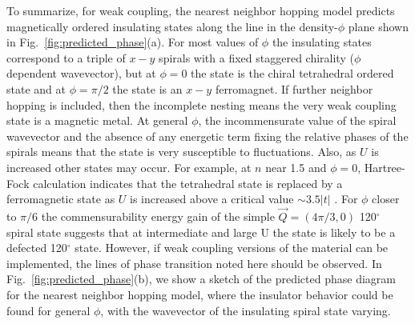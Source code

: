 \documentclass[%
reprint,
superscriptaddress,
twocolumn,
 amsmath,amssymb,
 aps,
 prb,
]{revtex4-2}
\begin{document}
To summarize, for weak coupling, the nearest neighbor hopping model predicts magnetically ordered insulating states along the line in the density-$\phi$ plane shown in Fig.~\ref{fig:predicted_phase}(a). For most values of $\phi$ the insulating states correspond to a triple of $x-y$ spirals with a fixed staggered chirality ($\phi$ dependent wavevector), but at $\phi=0$ the state is the chiral tetrahedral ordered state and at $\phi=\pi/2$ the state is an $x-y$ ferromagnet. If further neighbor hopping is included, then the incomplete nesting means the very weak coupling state is a magnetic metal. At general $\phi$, the incommensurate value of the spiral wavevector and the absence of any energetic term fixing the relative phases of the spirals means that the state is very susceptible to fluctuations. Also, as $U$ is increased other states may occur. For example, at $n$ near 1.5 and $
\phi=0$, Hartree-Fock calculation indicates that the tetrahedral state is replaced by a ferromagnetic state as $U$ is increased above a critical value $\sim 3.5|t|$ \cite{pasrija2016noncollinear}. For $\phi$ closer to $\pi/6$ the commensurability energy gain of the simple $\vec{Q}=(4\pi/3,0)$ 120$^\circ$ spiral state suggests that at intermediate and large U the state is likely to be a defected 120$^\circ$ state. However, if weak coupling versions of the material can be implemented, the lines of phase transition noted here should be observed. In Fig.~\ref{fig:predicted_phase}(b), we show a sketch of the predicted phase diagram for the nearest neighbor hopping model, where the insulator behavior could be found for general $\phi$, with the wavevector of the insulating spiral state varying.




\end{document}

